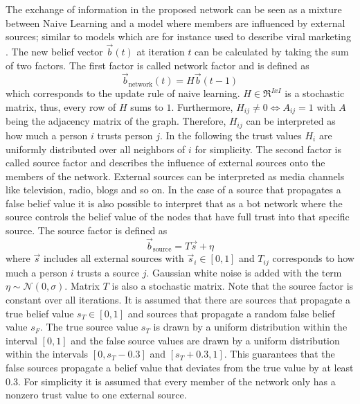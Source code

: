 \documentclass[11pt, a4paper]{article}
\newcommand{\matr}[1]{\bm{\mathit{#1}}}
\begin{document}
The exchange of information in the proposed network can be seen as a mixture between Naive Learning \cite{NaiveLearning1,NaiveLearning2,NaiveLearning3} and a model where members are influenced by external sources; similar to models which are for instance used to describe viral marketing \cite{viral_marketing1, viral_marketing_2, viral_marketing_3}. The new belief vector $\vec{b}(t)$ at iteration $t$ can be calculated by taking the sum of two factors. The first factor is called network factor and is defined as 
%
\begin{equation}
	\vec{b}_\text{network}(t) = \matr{H} \vec{b}(t-1)
\end{equation} 
%
which corresponds to the update rule of naive learning. $\matr{H} \in \Re^{IxI}$ is a stochastic matrix, thus, every row of $\matr{H}$ sums to $1$. Furthermore, $\matr{H}_{ij} \neq 0 \Leftrightarrow \matr{A}_{ij} = 1$ with $\matr{A}$ being the adjacency matrix of the graph. Therefore, $\matr{H}_{ij}$ can be interpreted as how much a person $i$ trusts person $j$. In the following the trust values $\matr{H}_{i}$ are uniformly distributed over all neighbors of $i$ for simplicity. \newline
The second factor is called source factor and describes the influence of external sources onto the members of the network. External sources can be interpreted as media channels like television, radio, blogs and so on. In the case of a source that propagates a false belief value it is also possible to interpret that as a bot network where the source controls the belief value of the nodes that have full trust into that specific source. The source factor is defined as
%
\begin{equation}
	\vec{b}_\text{source} = \matr{T} \vec{s}+\eta
\end{equation}
%
where $\vec{s}$ includes all external sources with $\vec{s}_i \in [0,1]$ and $\matr{T}_{ij}$ corresponds to how much a person $i$ trusts a source $j$. Gaussian white noise is added with the term $\eta \sim \mathcal{N}(0,\sigma)$. Matrix $\matr{T}$ is also a stochastic matrix. Note that the source factor is constant over all iterations. It is assumed that there are sources that propagate a true belief value $s_T \in [0,1]$ and sources that propagate a random false belief value $s_F$. The true source value $s_T$ is drawn by a uniform distribution within the interval $[0,1]$ and the false source values are drawn by a uniform distribution within the intervals $[0, s_T-0.3]$ and $[s_T+0.3,1]$. This guarantees that the false sources propagate a belief value that deviates from the true value by at least $0.3$. For simplicity it is assumed that every member of the network only has a nonzero trust value to one external source.\newline
\end{document}
